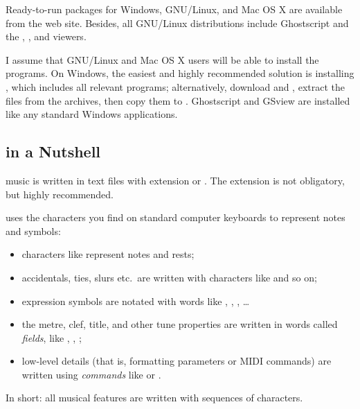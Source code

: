 \documentclass[a4paper,fullpage,12pt]{book}
\begin{document}
Ready-to-run packages for Windows, GNU/Linux, and Mac OS X are
available from the \ABCPLUS{} web site. Besides, all GNU/Linux
distributions include Ghostscript and the , , and
 viewers.

I assume that GNU/Linux and Mac OS X users will be able to install the
programs. On Windows, the easiest and highly recommended solution is
installing \abcexplorer, which includes all relevant programs;
alternatively, download \abcm{} and \abcmid{}, extract the 
files from the archives, then copy them to .
Ghostscript and GSview are installed like any standard Windows
applications.


\subsection{\ABC{} in a Nutshell}
\label{sec:nutshell}

\ABC{} music is written in text files with extension  or
. The extension is not obligatory, but highly recommended.

\ABC{} uses the characters you find on standard computer keyboards to
represent notes and symbols:

\begin{itemize}
  
  \item characters like  represent notes and rests;
  
  \item accidentals, ties, slurs etc.\ are written with characters like
  \car{= \_ - ( )} and so on;
  
  \item expression symbols are notated with words like ,
  , , {\ldots}
  
  \item the metre, clef, title, and other tune properties are written
  in words called \emph{fields}, like , ,
  ;
  
  \item low-level details (that is, formatting parameters or MIDI
  commands) are written using \emph{commands} like 
  or .
  
\end{itemize}

In short: all musical features are written with sequences of
characters.
\end{document}
